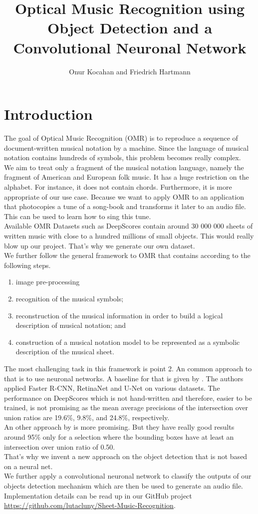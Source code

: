 \documentclass[twocolumn]{article}
\title{Optical Music Recognition using Object Detection and a Convolutional Neuronal Network}
\author{Onur Kocahan and Friedrich Hartmann}
\begin{document}
 
\maketitle
\section{Introduction}
The goal of Optical Music Recognition (OMR) is to reproduce a sequence of document-written musical notation by a machine. Since the language of musical notation contains hundreds of symbols, this problem becomes really complex. \\
We aim to treat only a fragment of the musical notation language, namely the fragment of American and European folk music. It has a huge restriction on the alphabet. For instance, it does not contain chords. Furthermore, it is more appropriate of our use case. Because we want to apply OMR to an application that photocopies a tune of a song-book and transforms it later to an audio file. This can be used to learn how to sing this tune.  \\
Available OMR Datasets such as DeepScores \citep{DeepScores} contain around 30 000 000 sheets of written music with close to a hundred millions of small objects. This would really blow up our project. That's why we generate our own dataset. \\
We further follow the general framework to OMR that contains according to \citet{state_of_the_art} the following steps. 
\begin{enumerate}
 \item image pre-processing
 \item recognition of the musical symbols;
 \item reconstruction of the musical information in order to build a logical description of musical notation; and
 \item construction of a musical notation model to be represented as a symbolic description of the musical sheet.
\end{enumerate}
The most challenging task in this framework is point 2. An common approach to that is to use neuronal networks. A baseline for that is given by \citet{Baseline}. The authors applied Faster R-CNN, RetinaNet and U-Net on various datasets. The performance on DeepScores which is not hand-written and therefore, easier to be trained, is not promising as the mean average precisions of the intersection over union ratios are 19.6\%, 9.8\%, and 24.8\%, respectively. \\
An other approach by \citet{GitHub_OMR} is more promising. But they have really good results around 95\% only for a selection where the bounding boxes have at least an intersection over union ratio of 0.50. \\
That's why we invent a new approach on the object detection that is not based on a neural net.\\ We further apply a convolutional neuronal network to classify the outputs of our objects detection mechanism which are then be used to generate an audio file. \\
Implementation details can be read up in our GitHub project \url{https://github.com/lutacluny/Sheet-Music-Recognition}.
\end{document}
